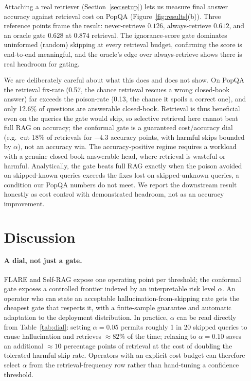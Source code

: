 \documentclass[a4paper,fleqn]{cas-dc}
\begin{document}
Attaching a real retriever (Section~\ref{sec:setup}) lets us measure final
answer accuracy against retrieval cost on PopQA (Figure~\ref{fig:results}(b)). Three
reference points frame the result: never-retrieve $0.126$, always-retrieve
$0.612$, and an oracle gate $0.628$ at $0.874$ retrieval. The ignorance-score
gate dominates uninformed (random) skipping at every retrieval budget,
confirming the score is end-to-end meaningful, and the oracle's edge over
always-retrieve shows there is real headroom for gating.

We are deliberately careful about what this does and does not show. On PopQA the
retrieval fix-rate (0.57, the chance retrieval rescues a wrong closed-book
answer) far exceeds the poison-rate (0.13, the chance it spoils a correct one),
and only 12.6\% of questions are answerable closed-book. Retrieval is thus
beneficial even on the queries the gate would skip, so selective retrieval here
cannot beat full RAG on accuracy; the conformal gate is a
guaranteed cost/accuracy dial (e.g.\ cut 18\% of retrievals for $-4.3$
accuracy points, with harmful skips bounded by $\alpha$), not an accuracy win.
The accuracy-positive regime requires a workload with a genuine
closed-book-answerable head, where retrieval is wasteful or harmful.
Analytically, the gate beats full RAG exactly when the poison avoided on
skipped-known queries exceeds the fixes lost on skipped-unknown queries, a
condition our PopQA numbers do not meet. We report the downstream result honestly as cost control with
demonstrated headroom, not as an accuracy improvement.

\section{Discussion}\label{sec:discussion}

\paragraph{A dial, not just a gate.} FLARE and Self-RAG expose one operating
point per threshold; the conformal gate exposes a controlled frontier
indexed by an interpretable risk level $\alpha$. An operator who can state an
acceptable hallucination-from-skipping rate gets the cheapest gate that respects
it, with a finite-sample guarantee and automatic adaptation to the deployment
distribution. In practice, $\alpha$ can be read directly from
Table~\ref{tab:dial}: setting $\alpha=0.05$ permits roughly 1 in 20 skipped
queries to cause hallucination and retrieves $\approx82\%$ of the time; relaxing
to $\alpha=0.10$ saves an additional $\approx10$ percentage points of retrieval
at the cost of doubling the tolerated harmful-skip rate. Operators with an
explicit cost budget can therefore select $\alpha$ from the retrieval-frequency
row rather than hand-tuning a confidence threshold.
\end{document}
